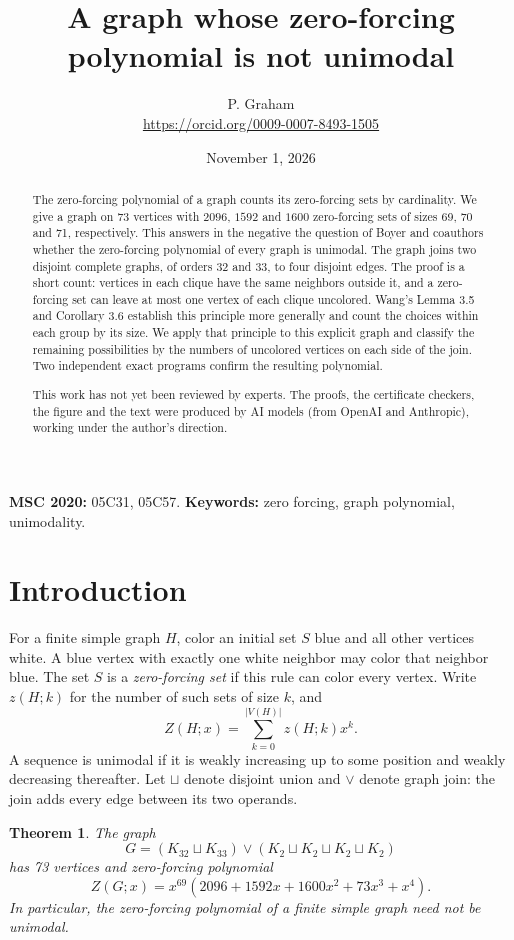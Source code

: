 \documentclass[11pt]{article}
\title{A graph whose zero-forcing polynomial is not unimodal}
\author{P. Graham\\ \small\url{https://orcid.org/0009-0007-8493-1505}}
\date{November 1, 2026}
\newtheorem{theorem}{Theorem}
\begin{document}
\maketitle
\begin{abstract}
The zero-forcing polynomial of a graph counts its zero-forcing sets by
cardinality. We give a graph on 73 vertices with $2096$, $1592$ and $1600$
zero-forcing sets of sizes 69, 70 and 71, respectively. This answers in the
negative the question of Boyer and coauthors whether the zero-forcing
polynomial of every graph is unimodal. The graph joins two disjoint complete
graphs, of orders 32 and 33, to four disjoint edges. The proof is a short
count: vertices in each clique have the same neighbors outside it, and a
zero-forcing set can leave at most one vertex of each clique uncolored.
Wang's Lemma 3.5 and Corollary 3.6 establish this principle more generally
and count the choices within each group by its size. We apply that
principle to this explicit graph and classify the remaining possibilities
by the numbers of uncolored vertices on each side of the join. Two
independent exact programs confirm the resulting polynomial.

This work has not yet been reviewed by experts. The proofs, the certificate checkers, the figure and the text were produced by AI models (from OpenAI and Anthropic), working under the author's direction.
\end{abstract}
\medskip
\noindent\textbf{MSC 2020:} 05C31, 05C57.\quad
\textbf{Keywords:} zero forcing, graph polynomial, unimodality.

\section{Introduction}

For a finite simple graph $H$, color an initial set $S$ blue and all other
vertices white. A blue vertex with exactly one white neighbor may color
that neighbor blue. The set $S$ is a \emph{zero-forcing set} if this rule
can color every vertex. Write $z(H;k)$ for the number of such sets of
size $k$, and
\[
 Z(H;x)=\sum_{k=0}^{|V(H)|}z(H;k)x^k.
\]
A sequence is unimodal if it is weakly increasing up to some position
and weakly decreasing thereafter. Let $\sqcup$ denote disjoint union and
$\vee$ denote graph join: the join adds every edge between its two operands.

\begin{theorem}\label{thm:main}
The graph
\[
 G=(K_{32}\sqcup K_{33})\vee(K_2\sqcup K_2\sqcup K_2\sqcup K_2)
\]
has 73 vertices and zero-forcing polynomial
\[
 Z(G;x)=x^{69}(2096+1592x+1600x^2+73x^3+x^4).
\]
In particular, the zero-forcing polynomial of a finite simple graph need
not be unimodal.
\end{theorem}
\end{document}
